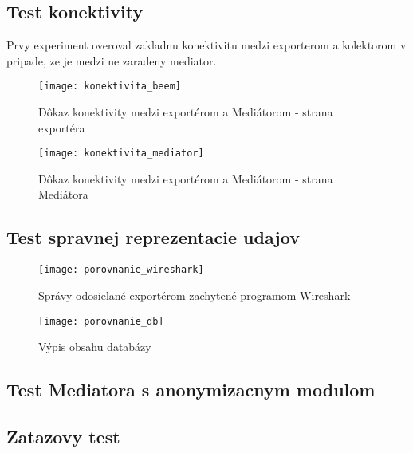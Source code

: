 
\subsection{Test konektivity}

Prvy experiment overoval zakladnu konektivitu medzi exporterom a kolektorom v pripade, ze je medzi ne 
zaradeny mediator. 

\begin{figure}[ht!]
\centering
\texttt{[image: konektivita\_beem]}
\caption{Dôkaz konektivity medzi exportérom a Mediátorom - strana exportéra}\label{o:konektivita_beem}
\end{figure}

\begin{figure}[ht!]
\centering
\texttt{[image: konektivita\_mediator]}
\caption{Dôkaz konektivity medzi exportérom a Mediátorom - strana Mediátora}\label{o:konektivita_mediator}
\end{figure}

\subsection{Test spravnej reprezentacie udajov}

\begin{figure}[ht!]
\centering
\texttt{[image: porovnanie\_wireshark]}
\caption{Správy odosielané exportérom zachytené programom Wireshark}\label{o:porovnanie_wireshark}
\end{figure}

\begin{figure}[ht!]
\centering
\texttt{[image: porovnanie\_db]}
\caption{Výpis obsahu databázy}\label{o:porovnanie_db}
\end{figure}



\subsection{Test Mediatora s anonymizacnym modulom}
\subsection{Zatazovy test}



